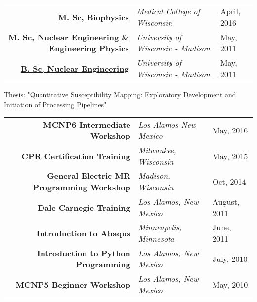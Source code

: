 


\begin{minipage}{\textwidth}
\begin{center}
	\begin{tabular}{rll}
		\href{https://app.box.com/s/62ffckadt53x8k93p9gp6ylbpqj9vscw}{\textbf{M. Sc, Biophysics}} & \emph{Medical College of Wisconsin} & April, 2016 \\ %
		\href{https://app.box.com/s/yyxi60lex92ovm7dus1d5xu9xshdqd91}{\textbf{M. Sc, Nuclear Engineering \& Engineering Physics}} & \emph{University of Wisconsin - Madison} & May, 2011 \\ %
		\href{https://app.box.com/s/yyxi60lex92ovm7dus1d5xu9xshdqd91}{\textbf{B. Sc, Nuclear Engineering}} & \emph{University of Wisconsin - Madison}& May, 2011 \\ %
	\end{tabular}
\end{center}
\end{minipage}

\begin{minipage}{\textwidth}
\begin{center}
	Thesis: \href{https://app.box.com/s/o8kksc6n51qpjzc3clfa127xtdfkayzd}{\normalsize"Quantitative Susceptibility Mapping: Exploratory Development and Initiation of Processing Pipelines"}
\end{center}
\end{minipage}


\begin{minipage}{\textwidth}
\begin{center}
	\begin{tabular}{rll}
	\textbf{MCNP6 Intermediate Workshop} &  \textit{Los Alamos New Mexico} & May, 2016 \\
	\textbf{CPR Certification Training}  &  \textit{Milwaukee, Wisconsin} & May, 2015 \\
	\textbf{General Electric MR Programming Workshop} & \textit{Madison, Wisconsin} & Oct, 2014 \\
	\textbf{Dale Carnegie Training} & \textit{Los Alamos, New Mexico} &  August, 2011 \\
	\textbf{Introduction to Abaqus} & \textit{Minneapolis, Minnesota} & June, 2011 \\
	\textbf{Introduction to Python Programming} & \textit{Los Alamos, New Mexico} & July, 2010 \\
	\textbf{MCNP5 Beginner Workshop} & \textit{Los Alamos, New Mexico} & May, 2010 \\
	\end{tabular}
\end{center}
\end{minipage}

